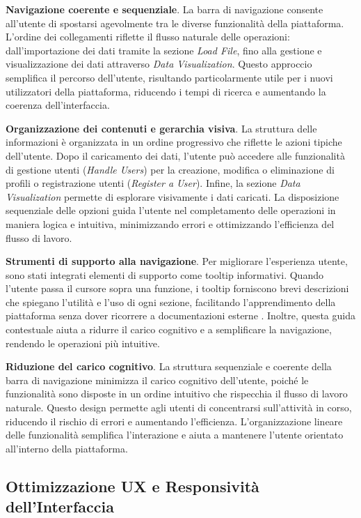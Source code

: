 \textbf{Navigazione coerente e sequenziale}. La barra di navigazione consente all’utente di spostarsi agevolmente tra le diverse funzionalità della piattaforma. L’ordine dei collegamenti riflette il flusso naturale delle operazioni: dall’importazione dei dati tramite la sezione \textit{Load File}, fino alla gestione e visualizzazione dei dati attraverso \textit{Data Visualization}. Questo approccio semplifica il percorso dell'utente, risultando particolarmente utile per i nuovi utilizzatori della piattaforma, riducendo i tempi di ricerca e aumentando la coerenza dell'interfaccia.

\textbf{Organizzazione dei contenuti e gerarchia visiva}. La struttura delle informazioni è organizzata in un ordine progressivo che riflette le azioni tipiche dell’utente. Dopo il caricamento dei dati, l’utente può accedere alle funzionalità di gestione utenti (\textit{Handle Users}) per la creazione, modifica o eliminazione di profili o registrazione utenti (\textit{Register a User}). Infine, la sezione \textit{Data Visualization} permette di esplorare visivamente i dati caricati. La disposizione sequenziale delle opzioni guida l’utente nel completamento delle operazioni in maniera logica e intuitiva, minimizzando errori e ottimizzando l’efficienza del flusso di lavoro.

\textbf{Strumenti di supporto alla navigazione}. Per migliorare l’esperienza utente, sono stati integrati elementi di supporto come tooltip informativi. Quando l’utente passa il cursore sopra una funzione, i tooltip forniscono brevi descrizioni che spiegano l’utilità e l’uso di ogni sezione, facilitando l’apprendimento della piattaforma senza dover ricorrere a documentazioni esterne \cite{cooper2014}. Inoltre, questa guida contestuale aiuta a ridurre il carico cognitivo e a semplificare la navigazione, rendendo le operazioni più intuitive.

\textbf{Riduzione del carico cognitivo}. La struttura sequenziale e coerente della barra di navigazione minimizza il carico cognitivo dell’utente, poiché le funzionalità sono disposte in un ordine intuitivo che rispecchia il flusso di lavoro naturale. Questo design permette agli utenti di concentrarsi sull’attività in corso, riducendo il rischio di errori e aumentando l’efficienza. L’organizzazione lineare delle funzionalità semplifica l’interazione e aiuta a mantenere l’utente orientato all’interno della piattaforma.

\subsection{Ottimizzazione UX e Responsività dell’Interfaccia}

